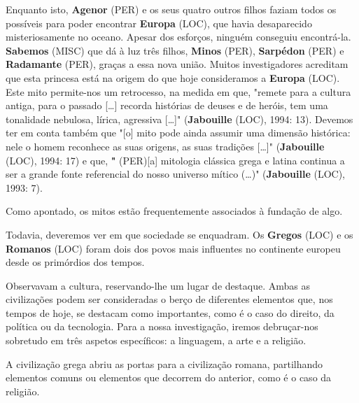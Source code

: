 \documentclass[12pt,a4paper]{article}
\begin{document}
Enquanto isto, \textbf{Agenor} (PER) e os seus quatro outros filhos faziam todos os possíveis para poder encontrar  \textbf{Europa} (LOC),  que  havia  desaparecido  misteriosamente  no  oceano.  Apesar  dos esforços,  ninguém  conseguiu  encontrá-la.  \textbf{Sabemos} (MISC)  que  dá  à  luz  três  filhos,  \textbf{Minos} (PER), \textbf{Sarpédon} (PER) e \textbf{Radamante} (PER), graças a essa nova união. Muitos investigadores acreditam que esta princesa está na origem do que hoje consideramos a \textbf{Europa} (LOC). Este mito permite-nos um  retrocesso,  na  medida  em  que,  "remete  para  a  cultura  antiga,  para  o  passado  […] recorda histórias de deuses e de heróis, tem uma  tonalidade nebulosa, lírica,  agressiva […]"  (\textbf{Jabouille} (LOC),  1994:  13).  Devemos  ter  em  conta  também  que  "[o]  mito  pode  ainda assumir  uma  dimensão  histórica:  nele  o  homem  reconhece  as  suas  origens,  as  suas tradições […]" (\textbf{Jabouille} (LOC), 1994: 17) e que, \textbf{"} (PER)[a] mitologia clássica grega e latina continua a ser a grande fonte referencial do nosso universo mítico (…)" (\textbf{Jabouille} (LOC), 1993: 7).

Como  apontado, os  mitos  estão frequentemente  associados à  fundação de algo.

Todavia, deveremos ver em que sociedade se enquadram. Os \textbf{Gregos} (LOC) e os \textbf{Romanos} (LOC) foram dois dos povos mais influentes no continente europeu desde os primórdios dos tempos.

Observavam  a  cultura,  reservando-lhe  um  lugar  de  destaque.  Ambas  as  civilizações podem  ser  consideradas  o  berço  de  diferentes  elementos  que,  nos  tempos  de  hoje,  se destacam como importantes, como é o caso do direito, da política ou da tecnologia. Para a  nossa  investigação,  iremos  debruçar-nos  sobretudo  em  três  aspetos  específicos:  a linguagem, a arte e a religião.

A  civilização  grega  abriu  as  portas  para  a  civilização  romana,  partilhando elementos  comuns ou  elementos  que decorrem  do anterior,  como  é o caso da religião.
\end{document}

